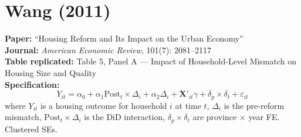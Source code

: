 \documentclass[11pt,a4paper]{article}
\begin{document}
\section{Wang (2011)}

\textbf{Paper:} ``Housing Reform and Its Impact on the Urban Economy''\\
\textbf{Journal:} \textit{American Economic Review}, 101(7): 2081--2117\\
\textbf{Table replicated:} Table 5, Panel A --- Impact of Household-Level Mismatch on Housing Size and Quality\\
\textbf{Specification:}
\[
Y_{it} = \alpha_0 + \alpha_1 \text{Post}_t \times \Delta_i + \alpha_2 \Delta_i + \mathbf{X}'_{it}\gamma + \delta_p \times \delta_t + \varepsilon_{it}
\]
where $Y_{it}$ is a housing outcome for household $i$ at time $t$, $\Delta_i$ is the pre-reform mismatch, $\text{Post}_t \times \Delta_i$ is the DiD interaction, $\delta_p \times \delta_t$ are province $\times$ year FE. Clustered SEs.

\vspace{0.3cm}
\noindent{}
\end{document}
